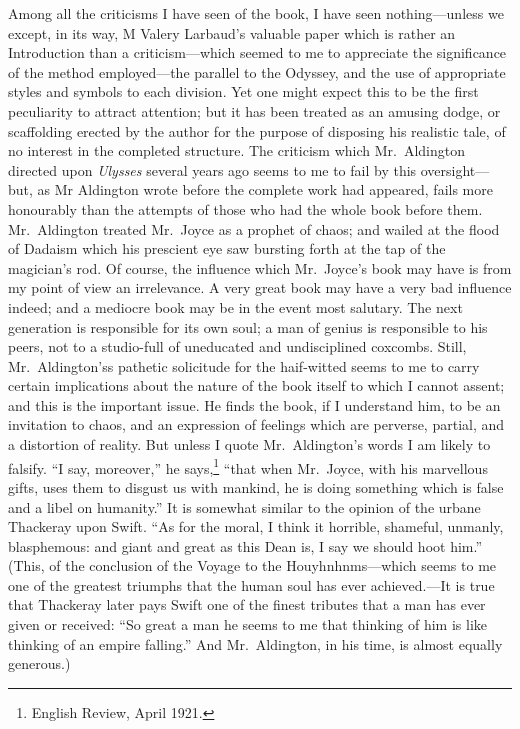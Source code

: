 Among all the criticisms I have seen of the book, I have seen
nothing---unless we except, in its way, M Valery Larbaud's valuable
paper which is rather an Introduction than a criticism---which seemed to
me to appreciate the significance of the method employed---the parallel
to the Odyssey, and the use of appropriate styles and symbols to each
division. Yet one might expect this to be the first peculiarity to
attract attention; but it has been treated as an amusing dodge, or
scaffolding erected by the author for the purpose of disposing his
realistic tale, of no interest in the completed structure. The criticism
which Mr.~Aldington directed upon \emph{Ulysses} several years ago seems
to me to fail by this oversight---but, as Mr Aldington wrote before the
complete work had appeared, fails more honourably than the attempts of
those who had the whole book before them. Mr.~Aldington treated
Mr.~Joyce as a prophet of chaos; and wailed at the flood of Dadaism
which his prescient eye saw bursting forth at the tap of the magician's
rod. Of course, the influence which Mr.~Joyce's book may have is from my
point of view an irrelevance. A very great book may have a very bad
influence indeed; and a mediocre book may be in the event most salutary.
The next generation is responsible for its own soul; a man of genius is
responsible to his peers, not to a studio-full of uneducated and
undisciplined coxcombs. Still, Mr.~Aldington'ss pathetic solicitude for
the haif-witted seems to me to carry certain implications about the
nature of the book itself to which I cannot assent; and this is the
important issue. He finds the book, if I understand him, to be an
invitation to chaos, and an expression of feelings which are perverse,
partial, and a distortion of reality. But unless I quote Mr.~Aldington's
words I am likely to falsify. ``I say, moreover,'' he says,\footnote{English
  Review, April 1921.} ``that when Mr.~Joyce, with his marvellous gifts,
uses them to disgust us with mankind, he is doing something which is
false and a libel on humanity.'' It is somewhat similar to the opinion
of the urbane Thackeray upon Swift. ``As for the moral, I think it
horrible, shameful, unmanly, blasphemous: and giant and great as this
Dean is, I say we should hoot him.'' (This, of the conclusion of the
Voyage to the Houyhnhnms---which seems to me one of the greatest
triumphs that the human soul has ever achieved.---It is true that
Thackeray later pays Swift one of the finest tributes that a man has
ever given or received: ``So great a man he seems to me that thinking of
him is like thinking of an empire falling.'' And Mr.~Aldington, in his
time, is almost equally generous.)


